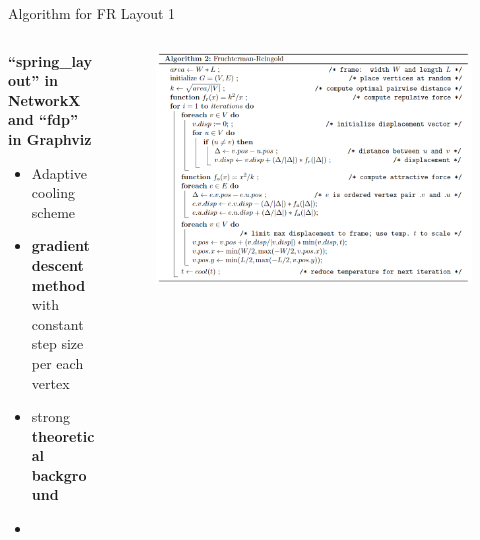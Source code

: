 \documentclass[13pt,aspectratio=169,table,dvipdfmx]{beamer}
\newif\ifShowHidden
\begin{document}
\ifShowHidden
    \begin{frame}{Algorithm for FR Layout 1}
        \begin{columns}
            \begin{column}{0.4\columnwidth}
                \textbf{``spring\_layout'' in NetworkX\\and ``fdp'' in Graphviz}
                \begin{itemize}
                    \item Adaptive cooling scheme
                    \item \textbf{gradient descent method}\\with constant step size\\per each vertex
                    \item strong \textbf{theoretical background}
                    \item \cite{tunkelang1999numerical}
                \end{itemize}
            \end{column}
            \begin{column}{0.6\columnwidth}
                \begin{figure}[htbp]
                    \centering
                    \includegraphics[width=\columnwidth]{imgs/FR_code.png}
                    \caption{\cite{kobourov2012spring}}
                \end{figure}
            \end{column}
        \end{columns}
    \end{frame}
\end{document}
